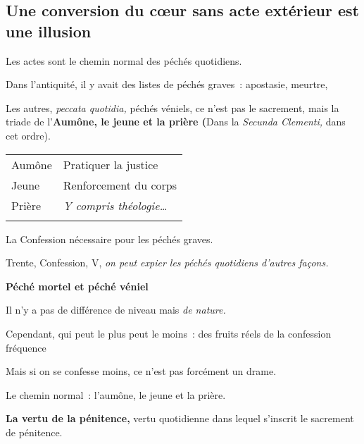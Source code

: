 \hypertarget{une-conversion-du-cux153ur-sans-acte-extuxe9rieur-est-une-illusion}{%
\subsection{Une conversion du cœur sans acte extérieur est une
illusion}\label{une-conversion-du-cux153ur-sans-acte-extuxe9rieur-est-une-illusion}}

Les actes sont le chemin normal des péchés quotidiens.

Dans l'antiquité, il y avait des listes de péchés graves~: apostasie,
meurtre,

Les autres, \emph{peccata quotidia,} péchés véniels, ce n'est pas le
sacrement, mais la triade de l'\textbf{Aumône, le jeune et la prière
(}Dans la \emph{Secunda Clementi,} dans cet ordre).



\begin{table}[h!]
    \centering
    \sidecaption{  }
 
\begin{tabular}{p{}p{}}
\toprule
Aumône

  & Pratiquer la justice \\
 
Jeune

  & Renforcement du corps \\
  
  Prière & \emph{Y compris théologie\ldots{}} \\
\\
\bottomrule
\end{tabular}
\label{tab:my_label}
\end{table}



La Confession nécessaire pour les péchés graves.

Trente, Confession, V, \emph{on peut expier les péchés quotidiens
d'autres façons.}

\textbf{Péché mortel et péché véniel}

Il n'y a pas de différence de niveau mais \emph{de nature.}

Cependant, qui peut le plus peut le moins~: des fruits réels de la
confession fréquence

Mais si on se confesse moins, ce n'est pas forcément un drame.

Le chemin normal~: l'aumône, le jeune et la prière.

\textbf{La vertu de la pénitence,} vertu quotidienne dans lequel
s'inscrit le sacrement de pénitence.

